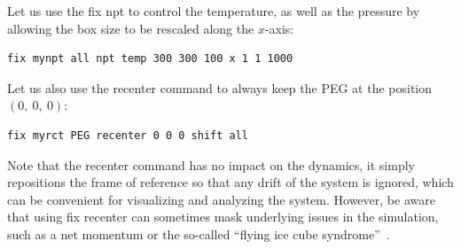 \documentclass[9pt,tutorial]{livecoms}
\newcommand{\lmpcmd}[1]{\colorbox{listing}{\textcolor{command}{\small{#1}}}} %
\begin{document}
Let us use the \lmpcmd{fix npt} to control the temperature, as
well as the pressure by allowing the box size to be rescaled along the $x$-axis:
\begin{lstlisting}
fix mynpt all npt temp 300 300 100 x 1 1 1000
\end{lstlisting}
Let us also use the \lmpcmd{recenter} command to always keep the PEG at
the position $(0,~0,~0)$:
\begin{lstlisting}
fix myrct PEG recenter 0 0 0 shift all
\end{lstlisting}

\begin{note}
  Note that the \lmpcmd{recenter} command has no impact on the dynamics,
  it simply repositions the frame of reference so that any drift of the
  system is ignored, which can be convenient for visualizing and analyzing
  the system. However, be aware that using \lmpcmd{fix recenter} can sometimes
  mask underlying issues in the simulation, such as a net momentum or the so-called
  ``flying ice cube syndrome''~\cite{wong2016good}.
\end{note}
\end{document}
